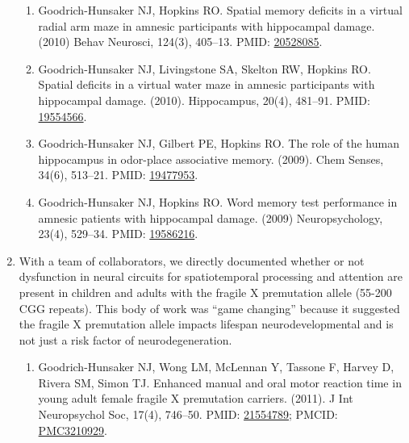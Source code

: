 \documentclass{nihbiosketch}
\begin{document}
\begin{enumerate}
	      \begin{enumerate}
	      	
	      	\item Goodrich-Hunsaker NJ, Hopkins RO. Spatial memory deficits in a virtual radial arm maze in amnesic participants with hippocampal damage. (2010) Behav Neurosci, 124(3), 405--13. PMID: \href{https:/pubmed.ncbi.nlm.nih.gov/20528085}{20528085}. 
	      	      
	      	\item Goodrich-Hunsaker NJ, Livingstone SA, Skelton RW, Hopkins RO. Spatial deficits in a virtual water maze in amnesic participants with hippocampal damage. (2010). Hippocampus, 20(4), 481--91. PMID: \href{https:/pubmed.ncbi.nlm.nih.gov/19554566}{19554566}. 
	      	      
	      	\item Goodrich-Hunsaker NJ, Gilbert PE, Hopkins RO. The role of the human hippocampus in odor-place associative memory. (2009). Chem Senses, 34(6), 513--21. PMID: \href{https:/pubmed.ncbi.nlm.nih.gov/19477953}{19477953}.
	      	
	      	\item Goodrich-Hunsaker NJ, Hopkins RO. Word memory test performance in amnesic patients with hippocampal damage. (2009) Neuropsychology, 23(4), 529--34. PMID: \href{https:/pubmed.ncbi.nlm.nih.gov/19586216}{19586216}. 
	      	      
	      \end{enumerate}
	      
	\item With a team of collaborators, we directly documented whether or not dysfunction in neural circuits for spatiotemporal processing and attention are present in children and adults with the fragile X premutation allele (55-200 CGG repeats). This body of work was “game changing” because it suggested the fragile X premutation allele impacts lifespan neurodevelopmental and is not just a risk factor of neurodegeneration.
	      
	      \begin{enumerate}   
	      	
	      	\item Goodrich-Hunsaker NJ, Wong LM, McLennan Y, Tassone F, Harvey D, Rivera SM, Simon TJ. Enhanced manual and oral motor reaction time in young adult female fragile X premutation carriers. (2011). J Int Neuropsychol Soc, 17(4), 746--50. PMID: \href{https:/pubmed.ncbi.nlm.nih.gov/21554789}{21554789}; PMCID: \href{https://www.ncbi.nlm.nih.gov/pmc/articles/PMC3210929}{PMC3210929}. 
	      	      

\end{enumerate}
\end{enumerate}
\end{document}

